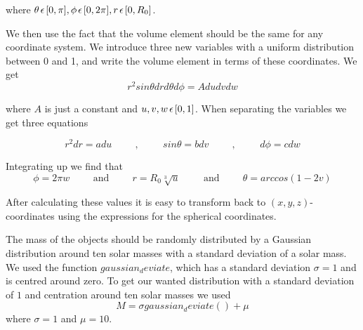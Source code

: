 \documentclass[a4paper,12pt, english]{article}
\begin{document}
where $ \theta \hspace{0.5mm} \epsilon \hspace{0.5mm} [0, \pi], \phi \hspace{0.5mm} \epsilon \hspace{0.5mm} [0, 2\pi], r \hspace{0.5mm} \epsilon \hspace{0.5mm} [0, R_0]$. 
 
We then use the fact that the volume element should be the same for any coordinate system. We introduce three new variables with a uniform distribution between 0 and 1, and write the volume element in terms of these coordinates. We get
\[
r^2 sin \theta dr d \theta d \phi = Adudvdw
\]

where $A$ is just a constant and $u, v, w \hspace{0.5mm} \epsilon \hspace{0.5mm} [0,1]$. When separating the variables we get three equations   

\[
r^2dr = adu \hspace{1cm}\mathrm{,}\hspace{1cm}
sin \theta = bdv \hspace{1cm}\mathrm{,}\hspace{1cm}
d \phi = cdw
\]

Integrating up we find that
\[
\phi = 2 \pi w  \hspace{1cm}\mathrm{and}\hspace{1cm}
r = R_0 \sqrt[3]{u}  \hspace{1cm}\mathrm{and}\hspace{1cm}
   \theta = arccos(1-2v) 
\]

After calculating these values it is easy to transform back to $(x,y,z)$-coordinates using the expressions for the spherical coordinates.


The mass of the objects should be randomly distributed by a Gaussian distribution around ten solar masses with a standard deviation of a solar mass. We used the function $gaussian_deviate$, which has a standard deviation $ \sigma = 1$ and is centred around zero. To get our wanted distribution with a standard deviation of $1$ and centration around ten solar masses we used  
$$ M = \sigma gaussian_deviate() + \mu $$
where $\sigma = 1$ and $\mu = 10$. 
\end{document}
